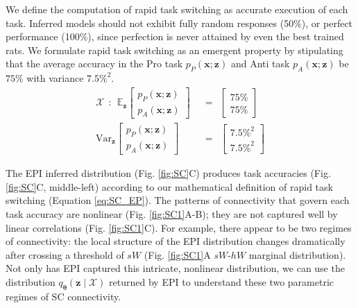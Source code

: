 \documentclass[11pt]{article}
\begin{document}
We define the computation of rapid task switching as accurate execution of each task.  Inferred models should not exhibit fully random responses (50\%), or perfect performance (100\%), since perfection is never attained by even the best trained rats.
We formulate rapid task switching as an emergent property by stipulating that the average accuracy in the Pro task $p_P(\mathbf{x}; \mathbf{z})$ and Anti task $p_A(\mathbf{x}; \mathbf{z})$ be $75\%$ with variance $7.5\%^2$.
\begin{equation}\label{eq:SC_EP}
\begin{split}
\mathcal{X} ~~:~~ \mathbb{E}_{\mathbf{z}}\begin{bmatrix} p_P(\mathbf{x}; \mathbf{z}) \\ p_A(\mathbf{x}; \mathbf{z}) \end{bmatrix}  &~~=~~  \begin{bmatrix} 75\% \\ 75\% \end{bmatrix}  \\ 
 \text{Var}_{\mathbf{z}}\begin{bmatrix} p_P(\mathbf{x}; \mathbf{z}) \\ p_A(\mathbf{x}; \mathbf{z}) \end{bmatrix}  &~~=~~  \begin{bmatrix} 7.5\%^2 \\ 7.5\%^2  \end{bmatrix}
\end{split}
\end{equation}

The EPI inferred distribution  (Fig. \ref{fig:SC}C) produces task accuracies (Fig. \ref{fig:SC}C, middle-left) according to our mathematical definition of rapid task switching (Equation \ref{eq:SC_EP}).
The patterns of connectivity that govern each task accuracy are nonlinear (Fig. \ref{fig:SC1}A-B); they are not captured well by linear correlations (Fig. \ref{fig:SC1}C).
For example, there appear to be two regimes of connectivity: the local structure of the EPI distribution changes dramatically after crossing a threshold of $sW$ (Fig. \ref{fig:SC1}A $sW$-$hW$ marginal distribution).
Not only has EPI captured this intricate, nonlinear distribution, we can use the distribution $q_{\bm{\theta}}(\mathbf{z} \mid \mathcal{X})$ returned by EPI to understand these two parametric regimes of SC connectivity.
\end{document}
